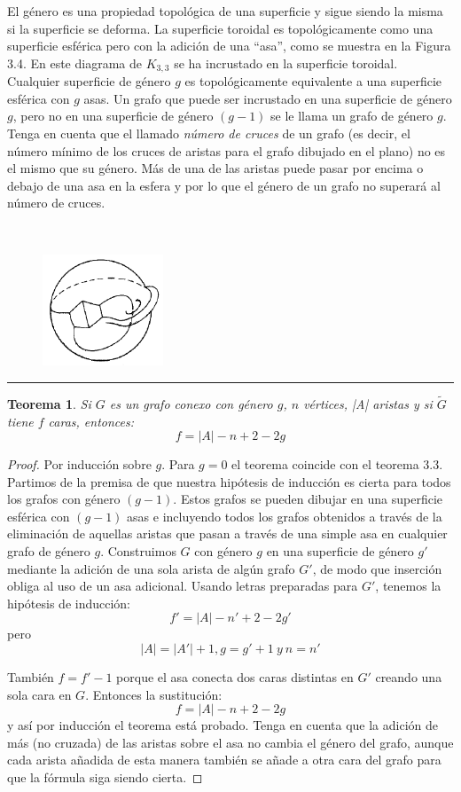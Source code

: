 \documentclass[10pt,a5paper]{book}
\newtheorem{teorema}{Teorema}[chapter]
\begin{document}
El género es una propiedad topológica de una superficie y sigue siendo la misma si la superficie se deforma. La superficie toroidal es topológicamente como una superficie esférica pero con la adición de una ``asa'', como se muestra en la Figura 3.4. En este diagrama de $K_{3,3}$ se ha incrustado en la superficie toroidal. Cualquier superficie de género $g$ es topológicamente equivalente a una superficie esférica con $g$ asas. Un grafo que puede ser incrustado en una superficie de género $g$, pero no en una superficie de género $(g-1)$ se le llama un grafo de género $g$. Tenga en cuenta que el llamado \emph{número de cruces} de un grafo (es decir, el número mínimo de los cruces de aristas para el grafo dibujado en el plano) no es el mismo que su género. Más de una de las aristas puede pasar por encima o debajo de una asa en la esfera y por lo que el género de un grafo no superará al número de cruces.

\begin{figure}[H]
\caption{ }
\hrulefill{}\\
\begin{center}\includegraphics[width=3.6cm]{Fig3_4.png}\end{center}
\end{figure}
\hrule{}
\begin{teorema}
Si $G$ es un grafo conexo con género $g$, $n$ vértices, |A| aristas y si $\widetilde{G}$ tiene $f$ caras, entonces:
\[f = |A| - n + 2 - 2g\]
\end{teorema}
\begin{proof}
Por inducción sobre $g$. Para $g=0$ el teorema coincide con el teorema 3.3. Partimos de la premisa de que nuestra hipótesis de inducción es cierta para todos los grafos con género $(g-1)$. Estos grafos se pueden dibujar en una superficie esférica con $(g-1)$ asas e incluyendo todos los grafos obtenidos a través de la eliminación de aquellas aristas que pasan a través de una simple asa en cualquier grafo de género $g$. Construimos $G$ con género $g$ en una superficie de género $g'$ mediante la adición de una sola arista de algún grafo $G'$, de modo que inserción obliga al uso de un asa adicional. Usando letras preparadas para $G'$, tenemos la hipótesis de inducción:
\[ f' = |A| - n' + 2 -2g'\]
pero
\[ |A| = |A'| +1, g = g' + 1\ y\ n = n' \]

También $f = f' - 1$ porque el asa conecta dos caras distintas en $G'$ creando una sola cara en $G$. Entonces la sustitución:
\[ f = |A| -n + 2 -2g \]
y así por inducción el teorema está probado. Tenga en cuenta que la adición de más (no cruzada) de las aristas sobre el asa no cambia el género del grafo, aunque cada arista añadida de esta manera también se añade a otra cara del grafo para que la fórmula siga siendo cierta.
\end{proof}
\end{document}
